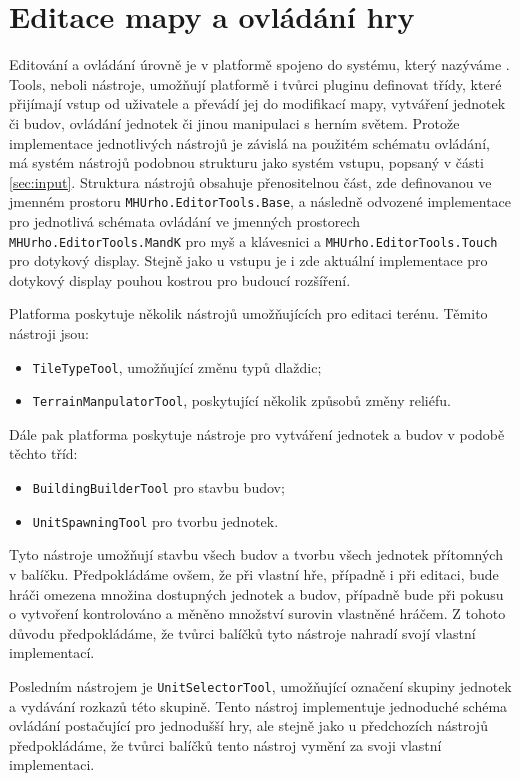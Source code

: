 \section{Editace mapy a ovládání hry}
\label{sec:tools}
Editování a ovládání úrovně je v platformě spojeno do systému, který nazýváme . Tools, neboli nástroje, umožňují platformě i tvůrci pluginu definovat třídy, které přijímají vstup od uživatele a převádí jej do modifikací mapy, vytváření jednotek či budov, ovládání jednotek či jinou manipulaci s herním světem. Protože implementace jednotlivých nástrojů je závislá na použitém schématu ovládání, má systém nástrojů podobnou strukturu jako systém vstupu, popsaný v části \ref{sec:input}. Struktura nástrojů obsahuje přenositelnou část, zde definovanou ve jmenném prostoru \texttt{MHUrho.EditorTools.Base}, a následně odvozené implementace pro jednotlivá schémata ovládání ve jmenných prostorech \texttt{MHUrho.EditorTools.MandK} pro myš a klávesnici a \texttt{MHUrho.EditorTools.Touch} pro dotykový display. Stejně jako u vstupu je i zde aktuální implementace pro dotykový display pouhou kostrou pro budoucí rozšíření.

Platforma poskytuje několik nástrojů umožňujících pro editaci terénu. Těmito nástroji jsou:
\begin{itemize}
	\item \texttt{TileTypeTool}, umožňující změnu typů dlaždic;
	\item \texttt{TerrainManpulatorTool}, poskytující několik způsobů změny reliéfu.
\end{itemize} 

Dále pak platforma poskytuje nástroje pro vytváření jednotek a budov v podobě těchto tříd:
\begin{itemize}
	\item \texttt{BuildingBuilderTool} pro stavbu budov;
	\item \texttt{UnitSpawningTool} pro tvorbu jednotek.
\end{itemize} 
Tyto nástroje umožňují stavbu všech budov a tvorbu všech jednotek přítomných v balíčku. Předpokládáme ovšem, že při vlastní hře, případně i při editaci, bude hráči omezena množina dostupných jednotek a budov, případně bude při pokusu o vytvoření kontrolováno a měněno množství surovin vlastněné hráčem. Z tohoto důvodu předpokládáme, že tvůrci balíčků tyto nástroje nahradí svojí vlastní implementací.

Posledním nástrojem je \texttt{UnitSelectorTool}, umožňující označení skupiny jednotek a vydávání rozkazů této skupině. Tento nástroj implementuje jednoduché schéma ovládání postačující pro jednodušší hry, ale stejně jako u předchozích nástrojů předpokládáme, že tvůrci balíčků tento nástroj vymění za svoji vlastní implementaci.

